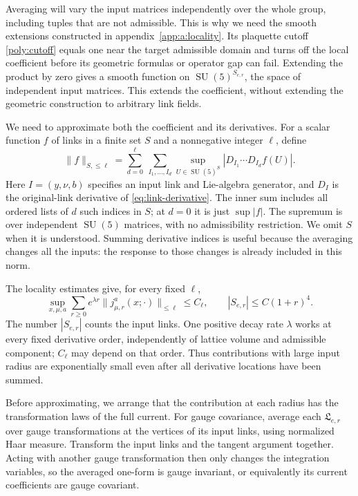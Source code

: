 \documentclass[11pt,a4paper]{article}
\theoremstyle{remark}
\DeclareMathOperator{\SU}{SU}
\begin{document}
Averaging will vary the input matrices independently over the whole group,
including tuples that are not admissible. This is why we need the smooth
extensions constructed in appendix~\ref{app:a:locality}. Its plaquette
cutoff \eqref{poly:cutoff} equals one near the target admissible domain
and turns off the local coefficient before its geometric formulas or
operator gap can fail. Extending the product by zero gives a smooth
function on $\SU(5)^{S_{e,r}}$, the space of independent input matrices.
This extends the coefficient, without extending the geometric construction
to arbitrary link fields.

We need to approximate both the coefficient and its derivatives. For a
scalar function $f$ of links in a finite set $S$ and a nonnegative integer
$\ell$, define
\begin{equation}
 \|f\|_{S,\leq\ell}
 =\sum_{d=0}^{\ell}\ \sum_{I_1,\ldots,I_d}
       \sup_{U\in\SU(5)^S}|D_{I_1}\cdots D_{I_d}f(U)|.
\end{equation}
Here $I=(y,\nu,b)$ specifies an input link and Lie-algebra generator,
and $D_I$ is the original-link derivative of
\eqref{eq:link-derivative}. The inner sum includes all ordered lists of
$d$ such indices in $S$; at $d=0$ it is just $\sup|f|$. The
supremum is over independent $\SU(5)$ matrices, with no admissibility
restriction. We omit $S$ when it is understood. Summing derivative
indices is useful because the averaging changes all the inputs: the
response to those changes is already included in this norm.

The locality estimates give, for every fixed $\ell$,
\begin{equation}
 \sup_{x,\mu,a}\sum_{r\geq0}e^{\lambda r}
       \|j_{\mu,r}^a(x;\cdot)\|_{\leq\ell}\leq C_\ell,
 \qquad |S_{e,r}|\leq C(1+r)^4 .
 \label{poly:input-bound}
\end{equation}
The number $|S_{e,r}|$ counts the input links. One positive decay rate
$\lambda$ works at every fixed derivative order, independently of
lattice volume and admissible component; $C_\ell$ may depend on that
order. Thus contributions with large input radius are exponentially
small even after all derivative locations have been summed.

Before approximating, we arrange that the contribution at each radius
has the transformation laws of the full current. For gauge covariance,
average each $\mathfrak L_{e,r}$ over gauge transformations at the
vertices of its input links, using normalized Haar measure. Transform
the input links and the tangent argument together. Acting with another
gauge transformation then only changes the integration variables, so the
averaged one-form is gauge invariant, or equivalently its current
coefficients are gauge covariant.
\end{document}

